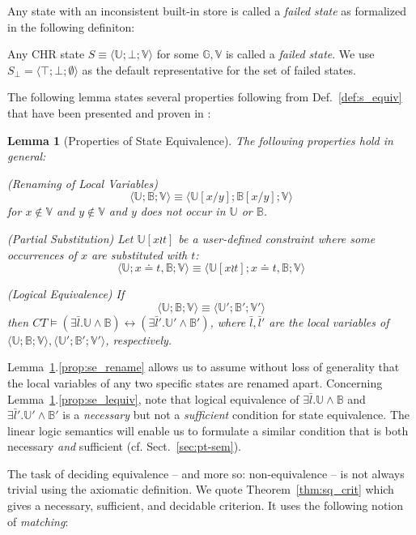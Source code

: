 \documentclass[acmtocl]{acmtrans2m}
\newtheorem{lemma}[theorem]{Lemma}
\newcommand\state[1]{\langle #1 \rangle}
\newcommand\chreq{\equiv}
\newcommand\subxy{\left[x/y\right]}
\newcommand\psubxt{\left[x\wr t\right] }
\newcommand\xet{\ensuremath{x\doteq t}}
\newcommand{\B}{\ensuremath{\mathbb{B}}}
\newcommand{\U}{\ensuremath{\mathbb{U}}}
\newcommand{\V}{\ensuremath{\mathbb{V}}}
\newcommand{\G}{\ensuremath{\mathbb{G}}}
\newcommand{\bl}{\bar{l}}
\begin{document}
Any state with an inconsistent built-in store is called a \emph{failed state} as
formalized in the following definiton:

\begin{definition}
Any CHR state $S\equiv\state{\U;\bot;\V}$ for some $\G,\V$ is called a
\emph{failed state}. We use $S_\bot=\state{\top;\bot;\emptyset}$ as the default
representative for the set of failed states.
\end{definition}

The following lemma states several properties following from
Def.~\ref{def:s_equiv} that have been presented and proven in
:

\begin{lemma}[Properties of State Equivalence]
\label{lem:se_derived}
The following properties hold in general:
\begin{longenum}
\item \label{prop:se_rename} \emph{(Renaming of Local Variables)}
\[
\state{\U;\B;\V} \chreq \state{\U\subxy;\B\subxy;\V}
\]
for $x\not\in\V$ and $y\not\in\V$ and $y$ does not occur in $\U$ or $\B$.
\item \label{prop:se_partial} \emph{(Partial Substitution)} Let $\U\psubxt$ be
a
user-defined constraint where \emph{some} occurrences of $x$ are substituted with $t$:
\[
\state{\U;\xet,\B;\V} \equiv \state{\U\psubxt;\xet,\B;\V}
\]
\item \label{prop:se_lequiv} \emph{(Logical Equivalence)} If
\[
\state{\U;\B;\V} \equiv \state{\U';\B';\V'}
\]
then $CT\models (\exists \bl.\U\wedge \B) \leftrightarrow
(\exists\bl'.\U'\wedge \B')$,  where $\bl,\bl'$ are the local variables of
$\state{\U;\B;\V},  \state{\U';\B';\V'}$, respectively.
\end{longenum}
\end{lemma}

Lemma~\ref{lem:se_derived}.\ref{prop:se_rename} allows us to assume without loss of generality that the local variables of any two specific states are renamed apart. Concerning Lemma~\ref{lem:se_derived}.\ref{prop:se_lequiv}, note that logical
equivalence of $\exists \bl.\U\wedge \B$ and $\exists\bl'.\U'\wedge \B'$ is
a \emph{necessary} but not a \emph{sufficient} condition for state equivalence. The linear logic semantics will enable us to formulate a similar condition that is both necessary \emph{and} sufficient (cf. Sect.~\ref{sec:pt-sem}).

The task of deciding equivalence -- and more so: non-equivalence -- is not
always trivial using the axiomatic definition. We quote
Theorem~\ref{thm:sq_crit} which gives a necessary, sufficient, and decidable
criterion. It uses the following notion of \emph{matching}:
\end{document}
